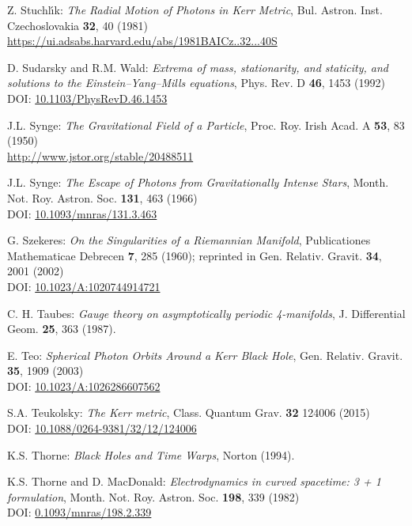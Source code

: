 \begin{thebibliography}{123}
Z. Stuchl\'{\i}k: {\em The Radial Motion of Photons in Kerr Metric},
Bul. Astron. Inst. Czechoslovakia {\bf 32}, 40 (1981)\\
\url{https://ui.adsabs.harvard.edu/abs/1981BAICz..32...40S}

D. Sudarsky and R.M. Wald: {\em Extrema of mass, stationarity, and staticity,
and solutions to the Einstein–Yang–Mills equations},
Phys. Rev. D {\bf 46}, 1453 (1992)\\
DOI: \href{https://doi.org/10.1103/PhysRevD.46.1453}{10.1103/PhysRevD.46.1453}

J.L. Synge: {\em The Gravitational Field of a Particle},
Proc. Roy. Irish Acad. A {\bf 53}, 83 (1950)\\
\url{http://www.jstor.org/stable/20488511}

J.L. Synge: {\em The Escape of Photons from Gravitationally Intense Stars},
Month. Not. Roy. Astron. Soc. {\bf 131}, 463 (1966)\\
DOI: \href{https://doi.org/10.1093/mnras/131.3.463}{10.1093/mnras/131.3.463}

G. Szekeres: {\em On the Singularities of a Riemannian Manifold},
Publicationes Mathematicae Debrecen {\bf 7}, 285 (1960); reprinted in
Gen. Relativ. Gravit. {\bf 34}, 2001 (2002)\\
DOI: \href{https://doi.org/10.1023/A:1020744914721}{10.1023/A:1020744914721}

C. H. Taubes: {\em Gauge theory on asymptotically periodic 4-manifolds},
J. Differential Geom. {\bf 25}, 363 (1987).

E. Teo: {\em Spherical Photon Orbits Around a Kerr Black Hole},
Gen. Relativ. Gravit. {\bf 35}, 1909 (2003)\\
DOI: \href{https://doi.org/10.1023/A:1026286607562}{10.1023/A:1026286607562}

S.A. Teukolsky: {\em The Kerr metric},
Class. Quantum Grav. {\bf 32} 124006 (2015)\\
DOI: \href{https://doi.org/10.1088/0264-9381/32/12/124006}{10.1088/0264-9381/32/12/124006}

K.S. Thorne: {\em Black Holes and Time Warps}, Norton (1994).

K.S. Thorne and D. MacDonald: {\em Electrodynamics in curved spacetime: 3 + 1 formulation},
Month. Not. Roy. Astron. Soc. {\bf 198}, 339 (1982)\\
DOI: \href{https://doi.org/10.1093/mnras/198.2.339}{0.1093/mnras/198.2.339}


\end{thebibliography}
